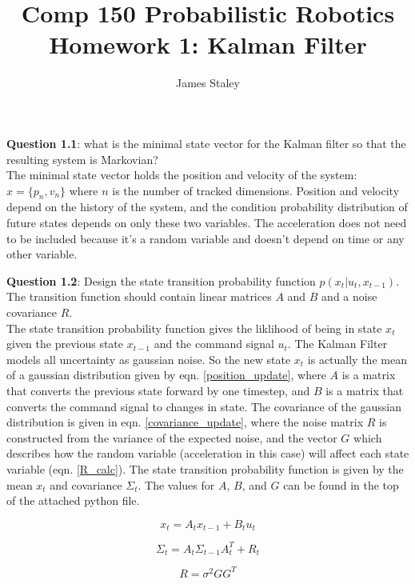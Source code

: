 \documentclass{article}
\title{Comp 150 Probabilistic Robotics Homework 1: Kalman Filter}
\author{James Staley}
\date{\vspace{-2em}}
\begin{document}
\maketitle
{\bf Question 1.1}: what is the minimal state vector for the Kalman filter so that the resulting system is Markovian?\\

The minimal state vector holds the position and velocity of the system: $x = \{p_n, v_n\}$ where $n$ is the number of tracked dimensions. Position and velocity depend on the history of the system, and the condition probability distribution of future states depends on only these two variables. The acceleration does not need to be included because it's a random variable and doesn't depend on time or any other variable. 

{\bf Question 1.2}: Design the state transition probability function $p(x_t | u_t, x_{t-1})$. The transition function should contain linear matrices $A$ and $B$ and a noise covariance $R$.\\

The state transition probability function gives the liklihood of being in state $x_t$ given the previous state $x_{t-1}$ and the command signal $u_t$. The Kalman Filter models all uncertainty as gaussian noise. So the new state $x_t$ is actually the mean of a gaussian distribution given by eqn. \ref{position_update}, where $A$ is a matrix that converts the previous state forward by one timestep, and $B$ is a matrix that converts the command signal to changes in state. The covariance of the gaussian distribution is given in eqn. \ref{covariance_update}, where the noise matrix $R$ is constructed from the variance of the expected noise, and the vector $G$ which describes how the random variable (acceleration in this case) will affect each state variable (eqn. \ref{R_calc}). The state transition probability function is given by the mean $x_t$ and covariance $\Sigma_t$. The values for $A$, $B$, and $G$ can be found in the top of the attached python file. 

\begin{equation}\label{position_update}
    x_t = A_t x_{t-1} + B_t u_t
\end{equation}

\begin{equation}\label{covariance_update}
    \Sigma_t = A_t \Sigma_{t-1} A^T_t + R_t
\end{equation}

\begin{equation}\label{R_calc}
    R = \sigma^2 G G^T
\end{equation}
\end{document}
